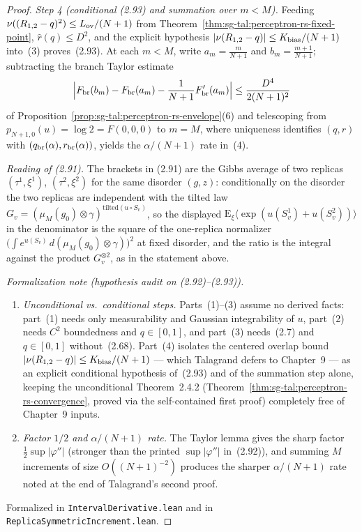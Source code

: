 \begin{proof}
\emph{Step 4 (conditional (2.93) and summation over $m<M$).} Feeding
$\nu((R_{1,2}-q)^2)\le L_{\rm ov}/(N+1)$ from Theorem~\ref{thm:sg-tal:perceptron-rs-fixed-point},
$\widehat r(q)\le D^2$, and the explicit hypothesis $|\nu(R_{1,2}-q)|\le K_{\rm bias}/(N+1)$ into~(3)
proves~(2.93). At each $m<M$, write $a_m=\frac{m}{N+1}$ and $b_m=\frac{m+1}{N+1}$; subtracting the
branch Taylor estimate
\[
 \Bigl|F_{\rm br}(b_m)-F_{\rm br}(a_m)-\frac{1}{N+1}F'_{\rm br}(a_m)\Bigr|\le\frac{D^4}{2(N+1)^2}
\]
of Proposition~\ref{prop:sg-tal:perceptron-rs-envelope}(6) and telescoping from
$p_{N+1,0}(u)=\log 2=F(0,0,0)$ to $m=M$, where uniqueness identifies $(q,r)$ with
$(q_{\rm br}(\alpha),r_{\rm br}(\alpha))$, yields the $\alpha/(N+1)$ rate in~(4).

\emph{Reading of (2.91).} The brackets in (2.91) are the Gibbs average of two replicas $(\tau^1,\xi^1)$, $(\tau^2,\xi^2)$ for the same
disorder $(g,z)$: conditionally on the disorder the two replicas are independent with the tilted law
$G_v=(\mu_M(g_0)\otimes\gamma)^{\mathrm{tilted}(u\circ S_v)}$, so the displayed $\mathrm E_\xi\langle\exp(u(S^1_v)+u(S^2_v))\rangle$ in the denominator is the
square of the one-replica normalizer $\bigl(\int e^{u(S_v)}\,d(\mu_M(g_0)\otimes\gamma)\bigr)^2$ at fixed disorder, and the ratio is
the integral against the product $G_v^{\otimes2}$, as in the statement above.

\emph{Formalization note (hypothesis audit on (2.92)--(2.93)).}
\begin{enumerate}
\item \emph{Unconditional vs.\ conditional steps.} Parts~(1)--(3) assume no derived facts: part~(1) needs only
measurability and Gaussian integrability of $u$, part~(2) needs $C^2$ boundedness and $q\in[0,1]$, and part~(3)
needs~(2.7) and $q\in[0,1]$ without~(2.68). Part~(4) isolates the centered overlap bound
$|\nu(R_{1,2}-q)|\le K_{\rm bias}/(N+1)$ --- which Talagrand defers to Chapter~9 --- as an explicit conditional
hypothesis of~(2.93) and of the summation step alone, keeping the unconditional Theorem~2.4.2
(Theorem~\ref{thm:sg-tal:perceptron-rs-convergence}, proved via the self-contained first proof) completely free
of Chapter~9 inputs.
\item \emph{Factor $1/2$ and $\alpha/(N+1)$ rate.} The Taylor lemma gives the sharp factor $\frac12\sup|\varphi''|$
(stronger than the printed $\sup|\varphi''|$ in~(2.92)), and summing $M$ increments of size $O((N+1)^{-2})$
produces the sharper $\alpha/(N+1)$ rate noted at the end of Talagrand's second proof.
\end{enumerate}
Formalized in \texttt{IntervalDerivative.lean} and in \texttt{ReplicaSymmetricIncrement.lean}.
\end{proof}



